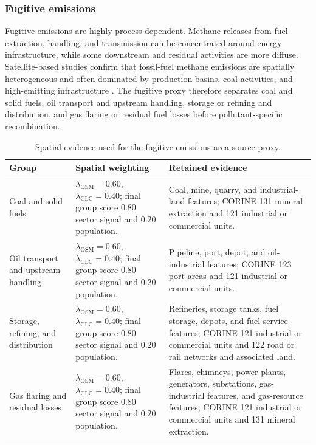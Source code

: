 \subsubsection{Fugitive emissions}
\label{sec:combined-fugitive}

Fugitive emissions are highly process-dependent. Methane releases from
fuel extraction, handling, and transmission can be concentrated around
energy infrastructure, while some downstream and residual activities are
more diffuse. Satellite-based studies confirm that fossil-fuel methane
emissions are spatially heterogeneous and often dominated by production
basins, coal activities, and high-emitting infrastructure
\citep{Lu2023FuelMethane}. The fugitive proxy therefore separates coal
and solid fuels, oil transport and upstream handling, storage or refining
and distribution, and gas flaring or residual fuel losses before
pollutant-specific recombination.

\begin{table}[htbp]
  \centering
  \caption{Spatial evidence used for the fugitive-emissions area-source proxy.}
  \label{tab:fugitive-spatial-rules}
  \scriptsize
  \begin{tabular}{p{} p{} p{}}
    \toprule
    Group & Spatial weighting & Retained evidence \\
    \midrule
    Coal and solid fuels &
    $\lambda_{\mathrm{OSM}}=0.60$, $\lambda_{\mathrm{CLC}}=0.40$; final group score $0.80$ sector signal and $0.20$ population. &
    Coal, mine, quarry, and industrial-land features; CORINE 131 mineral extraction and 121 industrial or commercial units. \\
    Oil transport and upstream handling &
    $\lambda_{\mathrm{OSM}}=0.60$, $\lambda_{\mathrm{CLC}}=0.40$; final group score $0.80$ sector signal and $0.20$ population. &
    Pipeline, port, depot, and oil-industrial features; CORINE 123 port areas and 121 industrial or commercial units. \\
    Storage, refining, and distribution &
    $\lambda_{\mathrm{OSM}}=0.60$, $\lambda_{\mathrm{CLC}}=0.40$; final group score $0.80$ sector signal and $0.20$ population. &
    Refineries, storage tanks, fuel storage, depots, and fuel-service features; CORINE 121 industrial or commercial units and 122 road or rail networks and associated land. \\
    Gas flaring and residual losses &
    $\lambda_{\mathrm{OSM}}=0.60$, $\lambda_{\mathrm{CLC}}=0.40$; final group score $0.80$ sector signal and $0.20$ population. &
    Flares, chimneys, power plants, generators, substations, gas-industrial features, and gas-resource features; CORINE 121 industrial or commercial units and 131 mineral extraction. \\
    \bottomrule
  \end{tabular}
\end{table}

